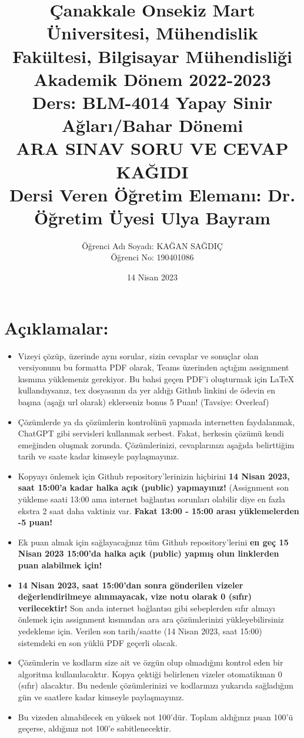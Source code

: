 \documentclass[11pt]{article}
\title{Çanakkale Onsekiz Mart Üniversitesi, Mühendislik Fakültesi, Bilgisayar Mühendisliği Akademik Dönem 2022-2023\\
Ders: BLM-4014 Yapay Sinir Ağları/Bahar Dönemi\\ 
ARA SINAV SORU VE CEVAP KAĞIDI\\
Dersi Veren Öğretim Elemanı: Dr. Öğretim Üyesi Ulya Bayram}
\author{%
\begin{minipage}{\textwidth}
\raggedright
Öğrenci Adı Soyadı: KAĞAN SAĞDIÇ\\ %
Öğrenci No: 190401086
\end{minipage}%
}
\date{14 Nisan 2023}
\begin{document}
\maketitle

\vspace{-.5in}
\section*{Açıklamalar:}
\begin{itemize}
    \item Vizeyi çözüp, üzerinde aynı sorular, sizin cevaplar ve sonuçlar olan versiyonunu bu formatta PDF olarak, Teams üzerinden açtığım assignment kısmına yüklemeniz gerekiyor. Bu bahsi geçen PDF'i oluşturmak için LaTeX kullandıysanız, tex dosyasının da yer aldığı Github linkini de ödevin en başına (aşağı url olarak) eklerseniz bonus 5 Puan! (Tavsiye: Overleaf)
    \item Çözümlerde ya da çözümlerin kontrolünü yapmada internetten faydalanmak, ChatGPT gibi servisleri kullanmak serbest. Fakat, herkesin çözümü kendi emeğinden oluşmak zorunda. Çözümlerinizi, cevaplarınızı aşağıda belirttiğim tarih ve saate kadar kimseyle paylaşmayınız. 
    \item Kopyayı önlemek için Github repository'lerinizin hiçbirini \textbf{14 Nisan 2023, saat 15:00'a kadar halka açık (public) yapmayınız!} (Assignment son yükleme saati 13:00 ama internet bağlantısı sorunları olabilir diye en fazla ekstra 2 saat daha vaktiniz var. \textbf{Fakat 13:00 - 15:00 arası yüklemelerden -5 puan!}
    \item Ek puan almak için sağlayacağınız tüm Github repository'lerini \textbf{en geç 15 Nisan 2023 15:00'da halka açık (public) yapmış olun linklerden puan alabilmek için!}
    \item \textbf{14 Nisan 2023, saat 15:00'dan sonra gönderilen vizeler değerlendirilmeye alınmayacak, vize notu olarak 0 (sıfır) verilecektir!} Son anda internet bağlantısı gibi sebeplerden sıfır almayı önlemek için assignment kısmından ara ara çözümlerinizi yükleyebilirsiniz yedekleme için. Verilen son tarih/saatte (14 Nisan 2023, saat 15:00) sistemdeki en son yüklü PDF geçerli olacak.
    \item Çözümlerin ve kodların size ait ve özgün olup olmadığını kontrol eden bir algoritma kullanılacaktır. Kopya çektiği belirlenen vizeler otomatikman 0 (sıfır) alacaktır. Bu nedenle çözümlerinizi ve kodlarınızı yukarıda sağladığım gün ve saatlere kadar kimseyle paylaşmayınız.
    \item Bu vizeden alınabilecek en yüksek not 100'dür. Toplam aldığınız puan 100'ü geçerse, aldığınız not 100'e sabitlenecektir.

\end{itemize}
\end{document}
